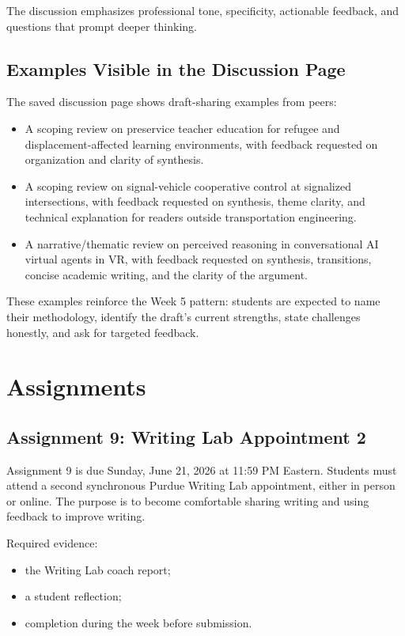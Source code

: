 \documentclass[10pt,letterpaper]{article}
\begin{document}
The discussion emphasizes professional tone, specificity, actionable feedback, and questions that prompt deeper thinking.

\subsection{Examples Visible in the Discussion Page}

The saved discussion page shows draft-sharing examples from peers:

\begin{itemize}
\item A scoping review on preservice teacher education for refugee and displacement-affected learning environments, with feedback requested on organization and clarity of synthesis.
\item A scoping review on signal-vehicle cooperative control at signalized intersections, with feedback requested on synthesis, theme clarity, and technical explanation for readers outside transportation engineering.
\item A narrative/thematic review on perceived reasoning in conversational AI virtual agents in VR, with feedback requested on synthesis, transitions, concise academic writing, and the clarity of the argument.
\end{itemize}

These examples reinforce the Week 5 pattern: students are expected to name their methodology, identify the draft's current strengths, state challenges honestly, and ask for targeted feedback.

\section{Assignments}

\subsection{Assignment 9: Writing Lab Appointment 2}

Assignment 9 is due Sunday, June 21, 2026 at 11:59 PM Eastern. Students must attend a second synchronous Purdue Writing Lab appointment, either in person or online. The purpose is to become comfortable sharing writing and using feedback to improve writing.

Required evidence:

\begin{itemize}
\item the Writing Lab coach report;
\item a student reflection;
\item completion during the week before submission.
\end{itemize}
\end{document}
